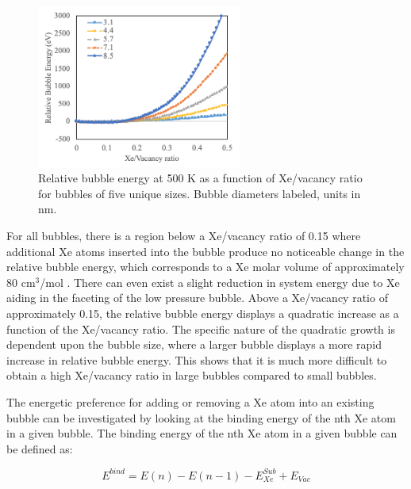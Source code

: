 \documentclass[review]{elsarticle}
\begin{document}
\begin{figure}[h]
 \centering
 \includegraphics[width=0.6\textwidth]{3_bubE.png} 
 \caption{Relative bubble energy at 500 K as a function of Xe/vacancy ratio for bubbles of five unique sizes. Bubble diameters labeled, units in nm.}
 \label{fig:bubE}
\end{figure}

For all bubbles, there is a region below a Xe/vacancy ratio of 0.15 where additional Xe atoms inserted into the bubble produce no noticeable change in the relative bubble energy, which corresponds to a Xe molar volume of approximately 80 cm$^3$/mol . There can even exist a slight reduction in system energy due to Xe aiding in the faceting of the low pressure bubble. Above a Xe/vacancy ratio of approximately 0.15, the relative bubble energy displays a quadratic increase as a function of the Xe/vacancy ratio. The specific nature of the quadratic growth is dependent upon the bubble size, where a larger bubble displays a more rapid increase in relative bubble energy. This shows that it is much more difficult to obtain a high Xe/vacancy ratio in large bubbles compared to small bubbles. 

\FloatBarrier

The energetic preference for adding or removing a Xe atom into an existing bubble can be investigated by looking at the binding energy of the nth Xe atom in a given bubble. The binding energy of the nth Xe atom in a given bubble can be defined as:

\begin{equation}
\label{eq:bind}
E^{bind}= E(n)-E(n-1) - E_{Xe}^{Sub} + E_{Vac}
\end{equation}
\end{document}
